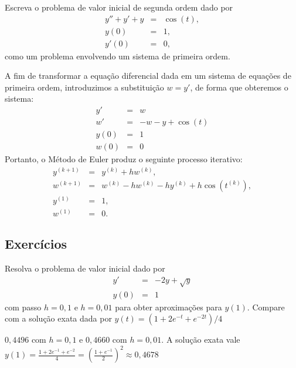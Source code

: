\begin{ex} Escreva o problema de valor inicial de segunda ordem dado por
\begin{eqnarray*}
y''+y'+y&=&\cos(t),\\
y(0)&=&1,\\
y'(0)&=&0,
\end{eqnarray*}
como um problema envolvendo um sistema de primeira ordem.
\end{ex}
A fim de transformar a equação diferencial dada em um sistema de equações de primeira ordem, introduzimos a substituição $w=y'$, de forma que obteremos o sistema:
\begin{eqnarray*}
y'&=&w\\
w'&=&-w-y+\cos(t)\\
y(0)&=&1\\
w(0)&=&0
\end{eqnarray*}
Portanto, o Método de Euler produz o seguinte processo iterativo:
\begin{eqnarray*}
y^{(k+1)}&=&y^{(k)}+hw^{(k)},\\
w^{(k+1)}&=&w^{(k)}-hw^{(k)}-hy^{(k)}+h\cos(t^{(k)}),\\
y^{(1)}&=&1,\\
w^{(1)}&=&0.
\end{eqnarray*}
\subsection*{Exercícios}

\begin{exer}Resolva o problema de valor inicial dado por
\begin{eqnarray*}
y'&=& -2y + \sqrt{y}\\
y(0)&=&1
\end{eqnarray*}
com passo $h=0,1$ e $h=0,01$ para obter aproximações para $y(1)$. Compare com a solução exata dada por $y(t) =  \left({1+2 e^{-t}+e^{-2 t}}\right)/{4}$
\end{exer}
\begin{resp}
  
 $0,4496$ com $h=0,1$ e $0,4660$ com $h=0,01$. A solução exata vale $y(1)=\frac{1+2e^{-1}+e^{-2}}{4}= \left(\frac{1+e^{-1}}{2}\right)^2\approx 0,4678$    
  
\end{resp}


